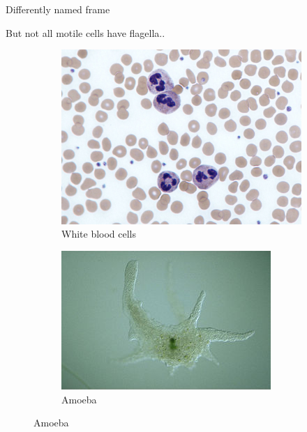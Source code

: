 \begin{frame}{\insertsubsectionhead}
\begin{figure}
	\end{figure}

\end{frame}

\begin{frame}{Differently named frame}

  But not all motile cells have flagella..
  
  \begin{figure}
    
		\begin{subfigure}{0.4\textwidth}
			\includegraphics[width=\textwidth]{src/img/example1}
			\caption{White blood cells}
		\end{subfigure}
		\begin{subfigure}{0.44\textwidth}
			\includegraphics[width=\textwidth]{src/img/example2}
			\caption{Amoeba}
		\end{subfigure}
    

\end{figure}
\end{frame}
